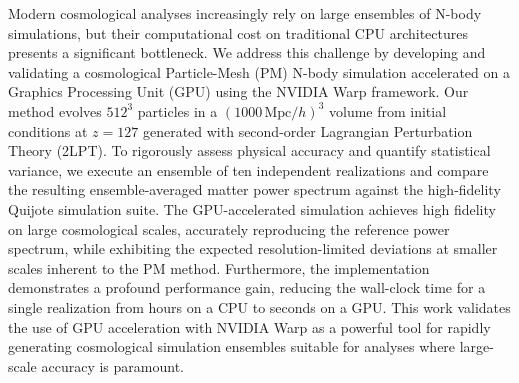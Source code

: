 \documentclass[]{article}
\begin{document}
Modern cosmological analyses increasingly rely on large ensembles of N-body simulations, but their computational cost on traditional CPU architectures presents a significant bottleneck. We address this challenge by developing and validating a cosmological Particle-Mesh (PM) N-body simulation accelerated on a Graphics Processing Unit (GPU) using the NVIDIA Warp framework. Our method evolves $512^3$ particles in a $(1000 \, \text{Mpc}/h)^3$ volume from initial conditions at $z=127$ generated with second-order Lagrangian Perturbation Theory (2LPT). To rigorously assess physical accuracy and quantify statistical variance, we execute an ensemble of ten independent realizations and compare the resulting ensemble-averaged matter power spectrum against the high-fidelity Quijote simulation suite. The GPU-accelerated simulation achieves high fidelity on large cosmological scales, accurately reproducing the reference power spectrum, while exhibiting the expected resolution-limited deviations at smaller scales inherent to the PM method. Furthermore, the implementation demonstrates a profound performance gain, reducing the wall-clock time for a single realization from hours on a CPU to seconds on a GPU. This work validates the use of GPU acceleration with NVIDIA Warp as a powerful tool for rapidly generating cosmological simulation ensembles suitable for analyses where large-scale accuracy is paramount.
\end{document}
